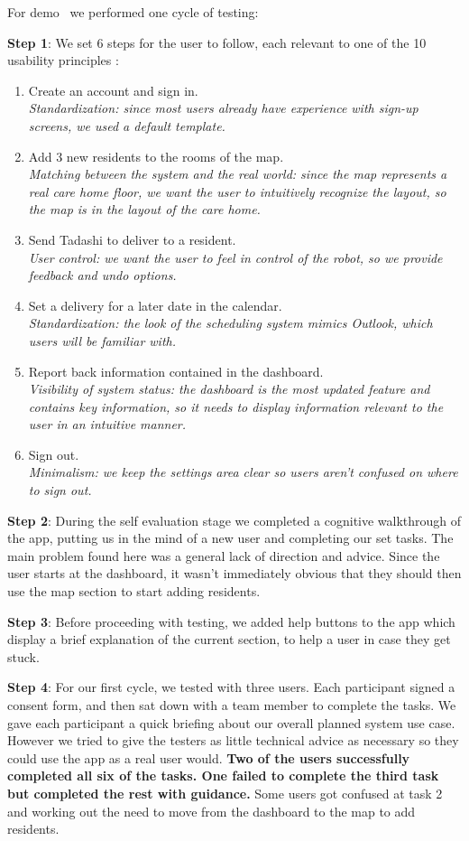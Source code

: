 \documentclass{article}
\begin{document}
For demo \demoNumber\ we performed one cycle of testing:

{\bf Step 1}: We set 6 steps for the user to follow, each relevant to one of the 10 usability principles \cite{heuristics}:
\begin{enumerate}
  \item Create an account and sign in. \\{\it Standardization: since most users already have experience with sign-up screens, we used a default template.}
  \item Add 3 new residents to the rooms of the map. \\{\it Matching between the system and the real world: since the map represents a real care home floor, we want the user to intuitively recognize the layout, so the map is in the layout of the care home.}
  \item Send Tadashi to deliver to a resident. \\{\it User control: we want the user to feel in control of the robot, so we provide feedback and undo options.}
  \item Set a delivery for a later date in the calendar. \\{\it Standardization: the look of the scheduling system mimics Outlook, which users will be familiar with.}
  \item Report back information contained in the dashboard. \\{\it Visibility of system status: the dashboard is the most updated feature and contains key information, so it needs to display information relevant to the user in an intuitive manner.}
  \item Sign out. \\{\it Minimalism: we keep the settings area clear so users aren't confused on where to sign out.}
\end{enumerate}

{\bf Step 2}: During the self evaluation stage we completed a cognitive walkthrough of the app, putting us in the mind of a new user and completing our set tasks. The main problem found here was a general lack of direction and advice. Since the user starts at the dashboard, it wasn't immediately obvious that they should then use the map section to start adding residents.

{\bf Step 3}: Before proceeding with testing, we added help buttons to the app which display a brief explanation of the current section, to help a user in case they get stuck.

{\bf Step 4}: For our first cycle, we tested with three users. Each participant signed a consent form, and then sat down with a team member to complete the tasks. We gave each participant a quick briefing about our overall planned system use case. However we tried to give the testers as little technical advice as necessary so they could use the app as a real user would. {\bf Two of the users successfully completed all six of the tasks. One failed to complete the third task but completed the rest with guidance.} Some users got confused at task 2 and working out the need to move from the dashboard to the map to add residents.
\end{document}
